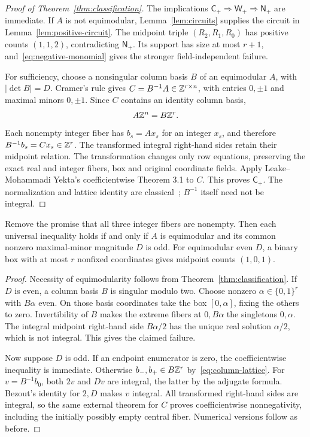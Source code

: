 \begin{proof}[Proof of Theorem~\ref{thm:classification}]
The implications \(\mathsf C_+\Rightarrow\mathsf W_+\Rightarrow\mathsf N_+\) are immediate. If \(A\) is not equimodular, Lemma~\ref{lem:circuits} supplies the circuit in Lemma~\ref{lem:positive-circuit}. The midpoint triple \((R_2,R_1,R_0)\) has positive counts \((1,1,2)\), contradicting \(\mathsf N_+\). Its support has size at most \(r+1\), and~\eqref{eq:negative-monomial} gives the stronger field-independent failure.

For sufficiency, choose a nonsingular column basis \(B\) of an equimodular \(A\), with \(|\det B|=D\). Cramer's rule gives \(C=B^{-1}A\in\mathbb Z^{r\times n}\), with entries \(0,\pm1\) and maximal minors \(0,\pm1\). Since \(C\) contains an identity column basis,
\begin{equation}\label{eq:column-lattice}
 A\mathbb Z^n=B\mathbb Z^r.
\end{equation}
Each nonempty integer fiber has \(b_s=Ax_s\) for an integer \(x_s\), and therefore \(B^{-1}b_s=Cx_s\in\mathbb Z^r\). The transformed integral right-hand sides retain their midpoint relation. The transformation changes only row equations, preserving the exact real and integer fibers, box and original coordinate fields. Apply Leake--Mohammadi Yekta's coefficientwise Theorem 3.1 to \(C\). This proves \(\mathsf C_+\). The normalization and lattice identity are classical~\cite[Theorem 3]{CGR}; \(B^{-1}\) itself need not be integral.
\end{proof}

\begin{theorem}\label{thm:odd}
Remove the promise that all three integer fibers are nonempty. Then each universal inequality holds if and only if \(A\) is equimodular and its common nonzero maximal-minor magnitude \(D\) is odd. For equimodular even \(D\), a binary box with at most \(r\) nonfixed coordinates gives midpoint counts \((1,0,1)\).
\end{theorem}
\begin{proof}
Necessity of equimodularity follows from Theorem~\ref{thm:classification}. If \(D\) is even, a column basis \(B\) is singular modulo two. Choose nonzero \(\alpha\in\{0,1\}^r\) with \(B\alpha\) even. On those basis coordinates take the box \([0,\alpha]\), fixing the others to zero. Invertibility of \(B\) makes the extreme fibers at \(0,B\alpha\) the singletons \(0,\alpha\). The integral midpoint right-hand side \(B\alpha/2\) has the unique real solution \(\alpha/2\), which is not integral. This gives the claimed failure.

Now suppose \(D\) is odd. If an endpoint enumerator is zero, the coefficientwise inequality is immediate. Otherwise \(b_-,b_+\in B\mathbb Z^r\) by~\eqref{eq:column-lattice}. For \(v=B^{-1}b_0\), both \(2v\) and \(Dv\) are integral, the latter by the adjugate formula. Bezout's identity for \(2,D\) makes \(v\) integral. All transformed right-hand sides are integral, so the same external theorem for \(C\) proves coefficientwise nonnegativity, including the initially possibly empty central fiber. Numerical versions follow as before.
\end{proof}

